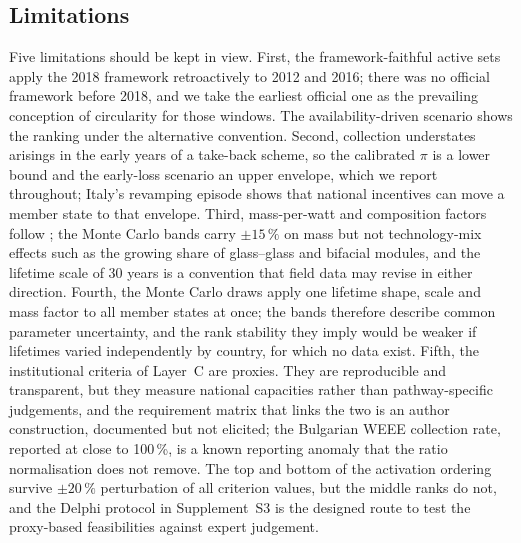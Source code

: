 \documentclass[a4paper,fleqn]{cas-sc}
\begin{document}


\subsection{Limitations}
Five limitations should be kept in view. First, the framework-faithful active sets apply the 2018 framework retroactively to 2012 and 2016; there was no official framework before 2018, and we take the earliest official one as the prevailing conception of circularity for those windows. The availability-driven scenario shows the ranking under the alternative convention. Second, collection understates arisings in the early years of a take-back scheme, so the calibrated $\pi$ is a lower bound and the early-loss scenario an upper envelope, which we report throughout; Italy's revamping episode shows that national incentives can move a member state to that envelope. Third, mass-per-watt and composition factors follow \citet{irena2016}; the Monte Carlo bands carry $\pm15\,\%$ on mass but not technology-mix effects such as the growing share of glass--glass and bifacial modules, and the lifetime scale of 30 years is a convention that field data may revise in either direction. Fourth, the Monte Carlo draws apply one lifetime shape, scale and mass factor to all member states at once; the bands therefore describe common parameter uncertainty, and the rank stability they imply would be weaker if lifetimes varied independently by country, for which no data exist. Fifth, the institutional criteria of Layer~C are proxies. They are reproducible and transparent, but they measure national capacities rather than pathway-specific judgements, and the requirement matrix that links the two is an author construction, documented but not elicited; the Bulgarian WEEE collection rate, reported at close to 100\,\%, is a known reporting anomaly that the ratio normalisation does not remove. The top and bottom of the activation ordering survive $\pm20\,\%$ perturbation of all criterion values, but the middle ranks do not, and the Delphi protocol in Supplement~S3 is the designed route to test the proxy-based feasibilities against expert judgement.
\end{document}
